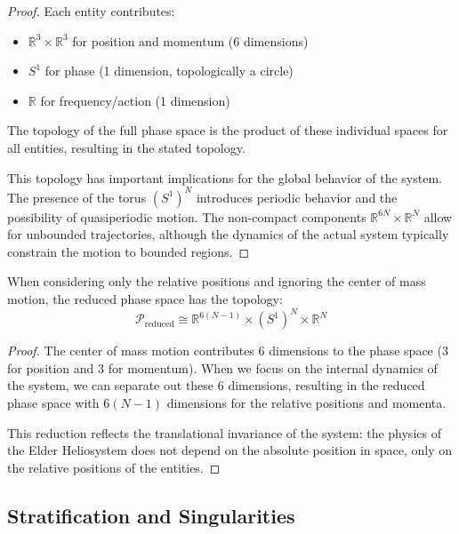 \begin{proof}
Each entity contributes:
\begin{itemize}
    \item $\mathbb{R}^3 \times \mathbb{R}^3$ for position and momentum (6 dimensions)
    \item $S^1$ for phase (1 dimension, topologically a circle)
    \item $\mathbb{R}$ for frequency/action (1 dimension)
\end{itemize}

The topology of the full phase space is the product of these individual spaces for all entities, resulting in the stated topology.

This topology has important implications for the global behavior of the system. The presence of the torus $(S^1)^N$ introduces periodic behavior and the possibility of quasiperiodic motion. The non-compact components $\mathbb{R}^{6N} \times \mathbb{R}^N$ allow for unbounded trajectories, although the dynamics of the actual system typically constrain the motion to bounded regions.
\end{proof}

\begin{theorem}
When considering only the relative positions and ignoring the center of mass motion, the reduced phase space has the topology:
\begin{equation}
\mathcal{P}_{\text{reduced}} \cong \mathbb{R}^{6(N-1)} \times (S^1)^N \times \mathbb{R}^N
\end{equation}
\end{theorem}

\begin{proof}
The center of mass motion contributes 6 dimensions to the phase space (3 for position and 3 for momentum). When we focus on the internal dynamics of the system, we can separate out these 6 dimensions, resulting in the reduced phase space with $6(N-1)$ dimensions for the relative positions and momenta.

This reduction reflects the translational invariance of the system: the physics of the Elder Heliosystem does not depend on the absolute position in space, only on the relative positions of the entities.
\end{proof}

\subsection{Stratification and Singularities}

